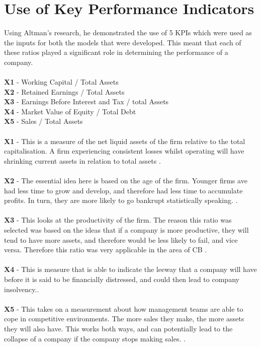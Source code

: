 \documentclass[11pt]{article}
\begin{document}
\appendix
\section{Use of Key Performance Indicators}
Using Altman's research, he demonstrated the use of 5 KPIs which were used as the inputs for both the models that were developed. This meant that each of these ratios played a significant role in determining the performance of a company. \\
\\
\textbf{X1} - Working Capital / Total Assets \\
\textbf{X2} - Retained Earnings / Total Assets\\
\textbf{X3} - Earnings Before Interest and Tax / total Assets\\
\textbf{X4} - Market Value of Equity / Total Debt\\
\textbf{X5} - Sales / Total Assets\\
\\
\textbf{X1} - This is a measure of the net liquid assets of the firm relative to the total capitalisation. A firm experiencing consistent losses whilst operating will have shrinking current assets in relation to total assets \cite{ref-six}. \\
\\
\textbf{X2} - The essential idea here is based on the age of the firm. Younger firms ave had less time to grow and develop, and therefore had less time to accumulate profits. In turn, they are more likely to go bankrupt statistically speaking. \cite{ref-six}.\\
\\
\textbf{X3} - This looks at the productivity of the firm. The reason this ratio was selected was based on the ideas that if a company is more productive, they will tend to have more assets, and therefore would be less likely to fail, and vice versa. Therefore this ratio was very applicable in the area of CB \cite{ref-six}.\\
\\
\textbf{X4} - This is measure that is able to indicate the leeway that a company will have before it is said to be financially distressed, and could then lead to company insolvency.\cite{ref-six}.\\
\\
\textbf{X5} - This takes on a measurement about how management teams are able to cope in competitive environments. The more sales they make, the more assets they will also have. This works both ways, and can potentially lead to the collapse of a company if the company stops making sales.  \cite{ref-six}.
\end{document}
